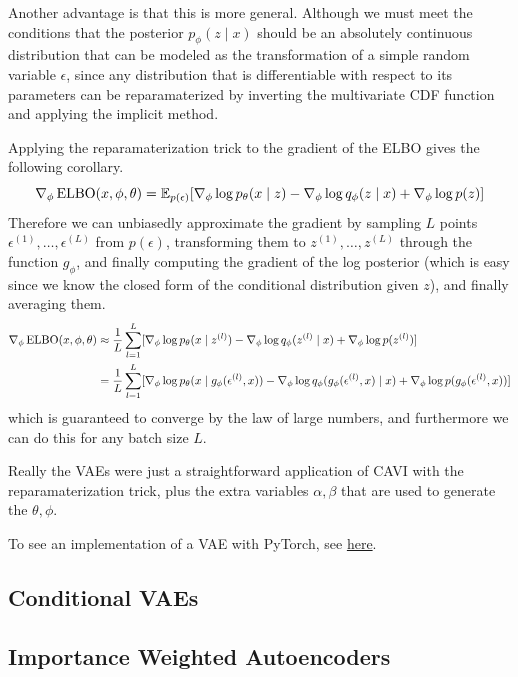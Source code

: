   Another advantage is that this is more general. Although we must meet the conditions that the posterior $p_\phi (z \mid x)$ should be an absolutely continuous distribution that can be modeled as the transformation of a simple random variable $\epsilon$, since any distribution that is differentiable with respect to its parameters can be reparamaterized by inverting the multivariate CDF function and applying the implicit method. 

  \begin{corollary}
    Applying the reparamaterization trick to the gradient of the ELBO gives the following corollary. 
    \begin{equation}
      \nabla_\phi \elbo(x, \phi, \theta) = \mathbb{E}_{p(\epsilon)}[\nabla_\phi \log p_\theta (x \mid z) - \nabla_\phi \log q_\phi (z \mid x) + \nabla_\phi \log p(z)]
    \end{equation}
    Therefore we can unbiasedly approximate the gradient by sampling $L$ points $\epsilon^{(1)}, \ldots, \epsilon^{(L)}$ from $p(\epsilon)$, transforming them to $z^{(1)}, \ldots, z^{(L)}$ through the function $g_\phi$, and finally computing the gradient of the log posterior (which is easy since we know the closed form of the conditional distribution given $z$), and finally averaging them. 
    \begin{align*}
      \nabla_\phi \elbo(x, \phi, \theta) & \approx \frac{1}{L} \sum_{l=1}^L [\nabla_\phi \log p_\theta (x \mid z^{(l)}) - \nabla_\phi \log q_\phi (z^{(l)} \mid x) + \nabla_\phi \log p(z^{(l)})] \\
                                         & = \frac{1}{L} \sum_{l=1}^L [\nabla_\phi \log p_\theta (x \mid g_\phi (\epsilon^{(l)}, x)) - \nabla_\phi \log q_\phi (g_\phi (\epsilon^{(l)}, x) \mid x) + \nabla_\phi \log p(g_\phi (\epsilon^{(l)}, x))]
    \end{align*}
    which is guaranteed to converge by the law of large numbers, and furthermore we can do this for any batch size $L$. 
  \end{corollary}


  Really the VAEs were just a straightforward application of CAVI with the reparamaterization trick, plus the extra variables $\alpha, \beta$ that are used to generate the $\theta, \phi$. 

  \begin{algo}
    To see an implementation of a VAE with PyTorch, see \href{code/vae.html}{here}. 
  \end{algo}

\subsection{Conditional VAEs}

\subsection{Importance Weighted Autoencoders}

